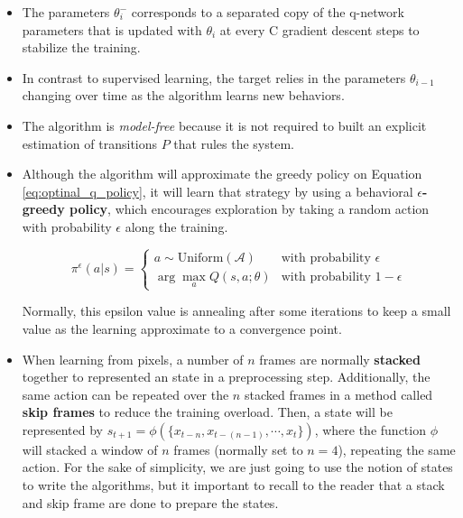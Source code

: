 \begin{itemize}
    \item The parameters $\theta^-_{i}$ corresponds to a separated copy of the q-network parameters that is updated with $\theta_{i}$ at every C gradient descent steps to stabilize the training.
    \item In contrast to supervised learning, the target relies in the parameters $\theta_{i-1}$ changing over time as the algorithm learns new behaviors.
    \item The algorithm is \textit{model-free} because it is not required to built an explicit estimation of transitions $P$ that rules the system.
    \item Although the algorithm will approximate the greedy policy on Equation \ref{eq:optinal_q_policy}, it will learn that strategy by using a behavioral \textbf{$\epsilon$-greedy policy}, which encourages exploration by taking a random action with probability $\epsilon$ along the training. 

    \begin{equation}
        \pi^\epsilon(a | s) = 
        \begin{cases} 
        a \sim \text{Uniform}(\mathcal{A}) & \text{with probability } \epsilon \\
        \arg\max_{a} Q(s, a; \theta) & \text{with probability } 1 - \epsilon
        \end{cases}
    \end{equation}
    
    Normally, this epsilon value is annealing after some iterations to keep a small value as the learning approximate to a convergence point.
    \item When learning from pixels, a number of $n$ frames are normally \textbf{stacked} together to represented an state in a preprocessing step. Additionally, the same action can be repeated over the $n$ stacked frames in a method called \textbf{skip frames} to reduce the training overload. Then, a state will be represented by $s_{t+1} = \phi(\{x_{t-n}, x_{t-(n-1)}, \cdots, x_{t}\})$, where the function $\phi$ will stacked a window of $n$ frames (normally set to $n=4$), repeating the same action. For the sake of simplicity, we are just going to use the notion of states to write the algorithms, but it important to recall to the reader that a stack and skip frame are done to prepare the states.

    
\end{itemize}

